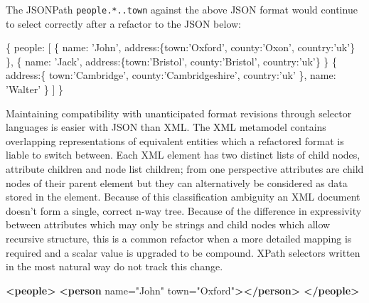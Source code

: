 \documentclass[]{article}
\newenvironment{Shaded}{}{}
\newcommand{\KeywordTok}[1]{\textcolor[rgb]{0.00,0.44,0.13}{\textbf{{#1}}}}
\newcommand{\DataTypeTok}[1]{\textcolor[rgb]{0.56,0.13,0.00}{{#1}}}
\newcommand{\StringTok}[1]{\textcolor[rgb]{0.25,0.44,0.63}{{#1}}}
\newcommand{\OtherTok}[1]{\textcolor[rgb]{0.00,0.44,0.13}{{#1}}}
\newcommand{\NormalTok}[1]{{#1}}
\begin{document}
The JSONPath \texttt{people.*..town} against the above JSON format would
continue to select correctly after a refactor to the JSON below:

\begin{Shaded}
\begin{Highlighting}[]
\NormalTok{\{}
   \DataTypeTok{people}\NormalTok{: [}
      \NormalTok{\{  }\DataTypeTok{name}\NormalTok{: }\StringTok{'John'}\NormalTok{, }
         \DataTypeTok{address}\NormalTok{:\{}\DataTypeTok{town}\NormalTok{:}\StringTok{'Oxford'}\NormalTok{, }\DataTypeTok{county}\NormalTok{:}\StringTok{'Oxon'}\NormalTok{, }\DataTypeTok{country}\NormalTok{:}\StringTok{'uk'}\NormalTok{\}}
      \NormalTok{\},}
      \NormalTok{\{  }\DataTypeTok{name}\NormalTok{: }\StringTok{'Jack'}\NormalTok{,}
         \DataTypeTok{address}\NormalTok{:\{}\DataTypeTok{town}\NormalTok{:}\StringTok{'Bristol'}\NormalTok{, }\DataTypeTok{county}\NormalTok{:}\StringTok{'Bristol'}\NormalTok{, }\DataTypeTok{country}\NormalTok{:}\StringTok{'uk'}\NormalTok{\}}
      \NormalTok{\}}
      \NormalTok{\{  }\DataTypeTok{address}\NormalTok{:\{}
            \DataTypeTok{town}\NormalTok{:}\StringTok{'Cambridge'}\NormalTok{, }\DataTypeTok{county}\NormalTok{:}\StringTok{'Cambridgeshire'}\NormalTok{, }
            \DataTypeTok{country}\NormalTok{:}\StringTok{'uk'}
         \NormalTok{\},}
         \DataTypeTok{name}\NormalTok{: }\StringTok{'Walter'}
      \NormalTok{\}}
   \NormalTok{]}
\NormalTok{\}}
\end{Highlighting}
\end{Shaded}

Maintaining compatibility with unanticipated format revisions through
selector languages is easier with JSON than XML. The XML metamodel
contains overlapping representations of equivalent entities which a
refactored format is liable to switch between. Each XML element has two
distinct lists of child nodes, attribute children and node list
children; from one perspective attributes are child nodes of their
parent element but they can alternatively be considered as data stored
in the element. Because of this classification ambiguity an XML document
doesn't form a single, correct n-way tree. Because of the difference in
expressivity between attributes which may only be strings and child
nodes which allow recursive structure, this is a common refactor when a
more detailed mapping is required and a scalar value is upgraded to be
compound. XPath selectors written in the most natural way do not track
this change.

\begin{Shaded}
\begin{Highlighting}[]
\KeywordTok{<people>}
   \KeywordTok{<person}\OtherTok{ name=}\StringTok{"John"}\OtherTok{ town=}\StringTok{"Oxford"}\KeywordTok{></person>}
\KeywordTok{</people>}
\end{Highlighting}
\end{Shaded}
\end{document}
